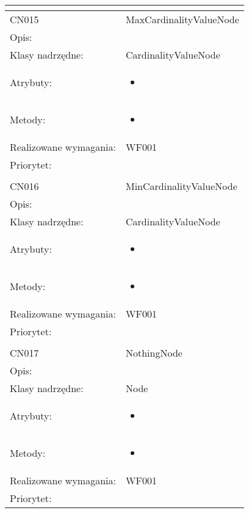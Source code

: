 \documentclass[a4paper,10pt]{article}
\begin{document}
\begin{center}
\begin{longtable}{|m{3cm}|m{9cm}|}
\multicolumn{2}{c}{} \\
 \hline

CN015 & MaxCardinalityValueNode \\ \hline
Opis: &     \\ \hline
Klasy nadrzędne: & CardinalityValueNode     \\ \hline
Atrybuty: & \begin{itemize}
 \item 
\end{itemize}
 \\ \hline
Metody: & \begin{itemize}
 \item 
\end{itemize}
  \\ \hline
Realizowane wymagania: & WF001 \\ \hline
Priorytet: &  \\ \hline

\multicolumn{2}{c}{} \\
 \hline

CN016 & MinCardinalityValueNode \\ \hline
Opis: &     \\ \hline
Klasy nadrzędne: & CardinalityValueNode     \\ \hline
Atrybuty: & \begin{itemize}
 \item 
\end{itemize}
 \\ \hline
Metody: & \begin{itemize}
 \item 
\end{itemize}
  \\ \hline
Realizowane wymagania: & WF001 \\ \hline
Priorytet: &  \\ \hline

\multicolumn{2}{c}{} \\
 \hline

CN017 & NothingNode \\ \hline
Opis: &     \\ \hline
Klasy nadrzędne: & Node     \\ \hline
Atrybuty: & \begin{itemize}
 \item 
\end{itemize}
 \\ \hline
Metody: & \begin{itemize}
 \item 
\end{itemize}
  \\ \hline
Realizowane wymagania: & WF001 \\ \hline
Priorytet: &  \\ \hline


\end{longtable}
\end{center}
\end{document}
